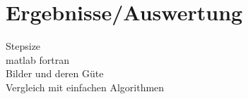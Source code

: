 ﻿\section{Ergebnisse/Auswertung}
Stepsize \\
matlab fortran \\
Bilder und deren Güte \\
Vergleich mit einfachen Algorithmen